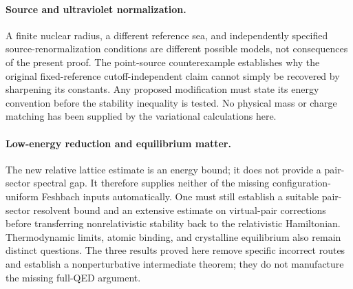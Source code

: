 \paragraph{Source and ultraviolet normalization.}
A finite nuclear radius, a different reference sea, and independently
specified source-renormalization conditions are different possible
models, not consequences of the present proof. The point-source
counterexample establishes why the original fixed-reference
cutoff-independent claim cannot simply be recovered by sharpening its
constants. Any proposed modification must state its energy convention
before the stability inequality is tested. No physical mass or charge
matching has been supplied by the variational calculations here.

\paragraph{Low-energy reduction and equilibrium matter.}
The new relative lattice estimate is an energy bound; it does not
provide a pair-sector spectral gap. It therefore supplies neither of
the missing configuration-uniform Feshbach inputs automatically.
One must still establish a suitable pair-sector resolvent bound and
an extensive estimate on virtual-pair corrections before transferring
nonrelativistic stability back to the relativistic Hamiltonian.
Thermodynamic limits, atomic binding, and crystalline equilibrium also
remain distinct questions. The three results proved here remove
specific incorrect routes and establish a nonperturbative intermediate
theorem; they do not manufacture the missing full-QED argument.
